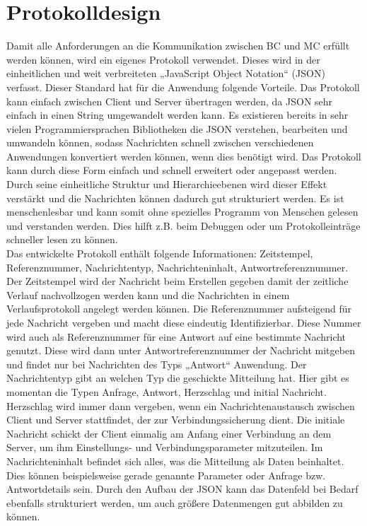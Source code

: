 \documentclass[thesis.tex]{subfiles}
\begin{document}
\section{Protokolldesign}\label{chap:protokolldesign}
Damit alle Anforderungen an die Kommunikation zwischen BC und MC erfüllt werden können, wird ein eigenes Protokoll verwendet.
Dieses wird in der einheitlichen und weit verbreiteten „JavaScript Object Notation“ (JSON) verfasst.
Dieser Standard hat für die Anwendung folgende Vorteile.
Das Protokoll kann einfach zwischen Client und Server übertragen werden, da JSON sehr einfach in einen String umgewandelt werden kann.
Es existieren bereits in sehr vielen Programmiersprachen Bibliotheken die JSON verstehen, bearbeiten und umwandeln können,
sodass Nachrichten schnell zwischen verschiedenen Anwendungen konvertiert werden können, wenn dies benötigt wird.
Das Protokoll kann durch diese Form einfach und schnell erweitert oder angepasst werden.
Durch seine einheitliche Struktur und Hierarchieebenen wird dieser Effekt verstärkt und die Nachrichten können dadurch gut strukturiert werden.
Es ist menschenlesbar und kann somit ohne spezielles Programm von Menschen gelesen und verstanden werden.
Dies hilft z.B. beim Debuggen oder um Protokolleinträge schneller lesen zu können.
\\

Das entwickelte Protokoll enthält folgende Informationen: Zeitstempel, Referenznummer, Nachrichtentyp, Nachrichteninhalt, Antwortreferenznummer.
Der Zeitstempel wird der Nachricht beim Erstellen gegeben damit der zeitliche Verlauf nachvollzogen werden kann und die
Nachrichten in einem Verlaufsprotokoll angelegt werden können.
Die Referenznummer aufsteigend für jede Nachricht vergeben und macht diese eindeutig Identifizierbar.
Diese Nummer wird auch als Referenznummer für eine Antwort auf eine bestimmte Nachricht genutzt.
Diese wird dann unter Antwortreferenznummer der Nachricht mitgeben und findet nur bei Nachrichten des Typs „Antwort“ Anwendung.
Der Nachrichtentyp gibt an welchen Typ die geschickte Mitteilung hat.
Hier gibt es momentan die Typen Anfrage, Antwort, Herzschlag und initial Nachricht.
Herzschlag wird immer dann vergeben, wenn ein Nachrichtenaustausch zwischen Client und Server stattfindet, der zur Verbindungssicherung dient.
Die initiale Nachricht schickt der Client einmalig am Anfang einer Verbindung an dem Server,
um ihm Einstellungs- und Verbindungsparameter mitzuteilen.
Im Nachrichteninhalt befindet sich alles, was die Mitteilung als Daten beinhaltet.
Dies können beispielsweise gerade genannte Parameter oder Anfrage bzw. Antwortdetails sein.
Durch den Aufbau der JSON kann das Datenfeld bei Bedarf ebenfalls strukturiert werden, um auch größere Datenmengen gut abbilden zu können.
\\
\end{document}
